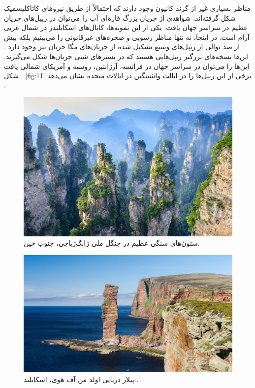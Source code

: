\documentclass[10pt,twocolumn,letterpaper]{article}
\begin{document}
مناظر بسیاری غیر از گرند کانیون وجود دارند که احتمالاً از طریق نیروهای کاتاکلیسمیک شکل گرفته‌اند. شواهدی از جریان بزرگ قاره‌ای آب را می‌توان در ریپل‌های جریان عظیم در سراسر جهان یافت. یکی از این نمونه‌ها، کانال‌های اسکابلندز در شمال غربی آرام است. در اینجا، نه تنها مناظر رسوبی و صخره‌های غیرقانونی را می‌بینیم بلکه بیش از صد توالی از ریپل‌های وسیع تشکیل شده از جریان‌های مگا جریان نیز وجود دارد \cite{78,79}. این‌ها نسخه‌های بزرگتر ریپل‌هایی هستند که در بسترهای شنی جریان‌ها شکل می‌گیرند. این‌ها را می‌توان در سراسر جهان در فرانسه، آرژانتین، روسیه و آمریکای شمالی یافت \cite{81}. شکل \ref{fig:11} برخی از این ریپل‌ها را در ایالت واشینگتن در ایالات متحده نشان می‌دهد \cite{80}.

\begin{figure}[b]
\begin{center}
   \includegraphics[width=1\linewidth]{zhangjiajie.jpg}
\end{center}
   \caption{ستون‌های سنگی عظیم در جنگل ملی ژانگ‌ژیاجی، جنوب چین.}
\label{fig:12}
\label{fig:onecol}
\end{figure}

\begin{figure}[b]
\begin{center}
   \includegraphics[width=1\linewidth]{hoy.jpg}
\end{center}
   \caption{پیلار دریایی اولد من آف هوی، اسکاتلند \cite{83}.}
\label{fig:13}
\label{fig:onecol}
\end{figure}
\end{document}
